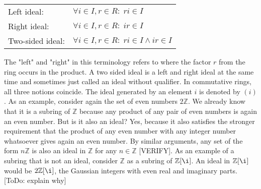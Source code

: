 \medskip
\begin{tabular}{l l}
Left ideal:      & $\forall i \in I, r \in R: \; r i \in I$  \\
Right ideal:     & $\forall i \in I, r \in R: \; i r \in I$  \\
Two-sided ideal: & $\forall i \in I, r \in R: \; r i \in I \wedge i r \in I$  \\
\end{tabular}
\medskip

The "left" and "right" in this terminology refers to where the factor $r$ from the ring occurs in the product. A two sided ideal is a left and right ideal at the same time and sometimes just called an ideal without qualifier. In commutative rings, all three notions coincide. The ideal generated by an element $i$ is denoted by $(i)$. As an example, consider again the set of even numbers $2 \mathbb{Z}$. We already know that it is a subring of $\mathbb{Z}$ because any product of any pair of even numbers is again an even number. But is it also an ideal? Yes, because it also satisfies the stronger requirement that the product of any even number with any integer number whatsoever gives again an even number. By similar arguments, any set of the form $n \mathbb{Z}$ is also an ideal in $\mathbb{Z}$ for any $n \in \mathbb{Z}$ [VERIFY]. As an example of a subring that is not an ideal, consider $\mathbb{Z}$ as a subring of $\mathbb{Z}[\i]$. An ideal in $\mathbb{Z}[\i]$ would be $2\mathbb{Z}[\i]$, the Gaussian integers with even real and imaginary parts. [ToDo: explain why]







